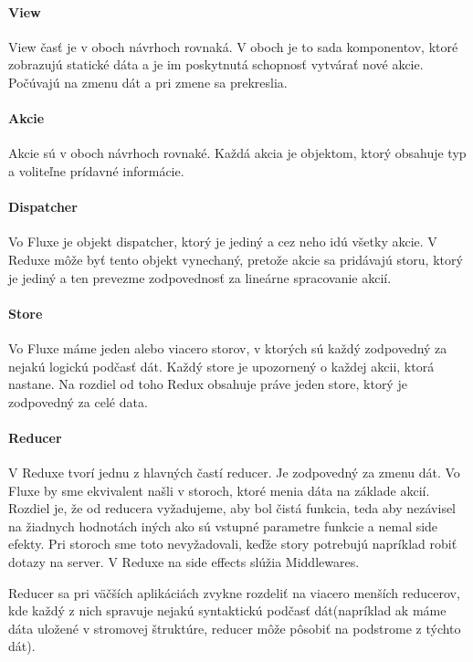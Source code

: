 \paragraph{View}%
View časť je v oboch návrhoch rovnaká. V oboch je to sada komponentov, ktoré zobrazujú statické dáta a je im poskytnutá schopnosť vytvárať nové akcie. Počúvajú na zmenu dát a pri zmene sa prekreslia.


\paragraph{Akcie}
Akcie sú v oboch návrhoch rovnaké. Každá akcia je objektom, ktorý obsahuje typ a voliteľne prídavné informácie.

\paragraph{Dispatcher}
Vo Fluxe je objekt dispatcher, ktorý je jediný a cez neho idú všetky akcie. V Reduxe môže byť tento objekt vynechaný, pretože akcie sa pridávajú storu, ktorý je jediný a ten prevezme zodpovednosť za lineárne spracovanie akcií.

\paragraph{Store}
Vo Fluxe máme jeden alebo viacero storov, v ktorých sú každý zodpovedný za nejakú logickú podčasť dát. Každý store je upozornený o každej akcii, ktorá nastane. Na rozdiel od toho Redux obsahuje práve jeden store, ktorý je zodpovedný za celé data.

\paragraph{Reducer}%
V Reduxe tvorí jednu z hlavných častí reducer. Je zodpovedný za zmenu dát. Vo Fluxe by sme ekvivalent našli v storoch, ktoré menia dáta na základe akcií. Rozdiel je, že od reducera vyžadujeme, aby bol čistá funkcia, teda aby nezávisel na žiadnych hodnotách iných ako sú vstupné parametre funkcie a nemal side efekty. Pri storoch sme toto nevyžadovali, keďže story potrebujú napríklad robiť dotazy na server. V Reduxe na side effects slúžia Middlewares.

Reducer sa pri väčších aplikáciách zvykne rozdeliť na viacero menších reducerov, kde každý z nich spravuje nejakú syntaktickú podčasť dát(napríklad ak máme dáta uložené v stromovej štruktúre, reducer môže pôsobiť na podstrome z týchto dát).

